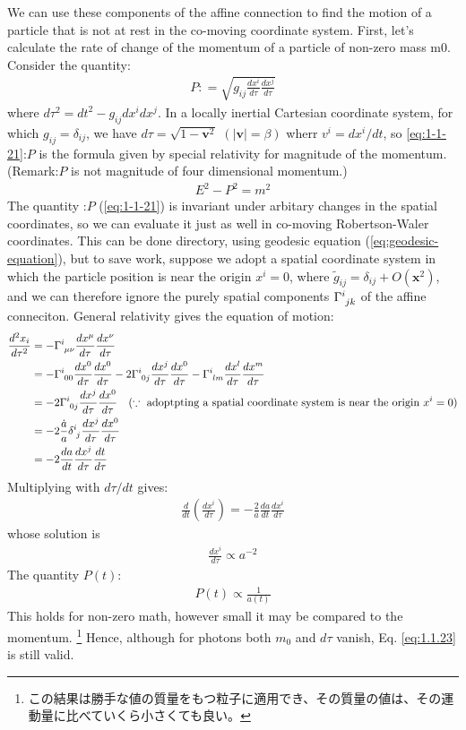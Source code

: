 \documentclass[11pt]{ltjsarticle}
\theoremstyle{plain}
\theoremstyle{break}
\newcommand{\mbfv}{\mathbf{v}}
\newcommand{\mbfx}{\mathbf{x}}
\newcommand{\tensorGamma}[1]{\tensor{\Gamma}{ #1}}
\begin{document}
We can use these components of the affine connection
to find the motion of a particle that is not at rest in the co-moving coordinate system.
First, let’s calculate the rate of change of the momentum of a particle of non-zero mass m0.
Consider the quantity:
\begin{align}
  P : = \sqrt{g_{ij} \frac{dx^i}{d\tau} \frac{dx^j}{d\tau}} \label{eq:1-1-21}
\end{align}
where $d\tau^2 = dt^2 -g_{ij}dx^i dx^j$.
In a locally inertial Cartesian coordinate system, for which $g_{ij} = \delta_{ij}$, we have $d\tau = \sqrt{1-\mbfv^2}\,\,(|\mbfv|=\beta)$ wherr $v^i = dx^i/dt$,
so \eqref{eq:1-1-21}:$P$ is the formula given by special relativity for magnitude of the momentum.(Remark:$P$ is not magnitude of four dimensional momentum.)
\begin{align}
  E^2 - P^2 = m^2
\end{align}
The quantity :$P$ (\eqref{eq:1-1-21}) is invariant under arbitary changes in the spatial coordinates, so we can evaluate it just as well in co-moving Robertson-Waler coordinates.
This can be done directory, using geodesic equation (\eqref{eq:geodesic-equation}), but to save work, suppose we adopt a spatial coordinate system in which the particle position is near the origin $x^i=0$, where $\tilde{g}_{ij} = \delta_{ij} + O(\mbfx^2)$, and we can therefore ignore the purely spatial components $\tensorGamma{^i_{jk}}$ of the affine conneciton.
General relativity gives the equation of motion:
\begin{align}
  \frac{d^2 x_i}{d \tau^2}
  &= - \tensorGamma{^i_{\mu\nu}} \frac{dx^\mu}{d\tau} \frac{dx^\nu}{d\tau}\\
  &= - \tensorGamma{^i_{00}} \frac{dx^0}{d\tau} \frac{dx^0}{d\tau}
     - 2\tensorGamma{^i_{0j}} \frac{dx^j}{d\tau} \frac{dx^0}{d\tau}
     - \tensorGamma{^i_{lm}} \frac{dx^l}{d\tau} \frac{dx^m}{d\tau} \\
  &= - 2\tensorGamma{^i_{0j}} \frac{dx^j}{d\tau} \frac{dx^0}{d\tau}
       \quad(\because \,\,\text{adoptpting a spatial coordinate system is near the origin $x^i=0$} )\\
  &=-2 \frac{\dot{a}}{a} \tensor{\delta}{^i_j} \frac{dx^j}{d\tau} \frac{dx^0}{d\tau} \\
  &=-2 \frac{da}{dt} \frac{dx^j}{d\tau} \frac{dt}{d\tau}
\end{align}
Multiplying with $d\tau/dt$ gives:
\begin{align}
  \frac{d}{dt}(\frac{dx^i}{d\tau}) = -\frac{2}{a} \frac{da}{dt}\frac{dx^i}{d\tau}
\end{align}
whose solution is
\begin{align}
  \frac{dx^i}{d\tau} \propto a^{-2}
\end{align}
The quantity $P(t)$:
\begin{align}
P(t) \propto \frac{1}{a(t)} \label{eq:1.1.23}
\end{align}%
This holds for non-zero math, however small it may be compared to the momentum. \footnote{この結果は勝手な値の質量をもつ粒子に適用でき、その質量の値は、その運動量に比べていくら小さくても良い。}
Hence, although for photons both $m_0$ and $d\tau$ vanish, Eq. \ref{eq:1.1.23} is still valid.
\end{document}
